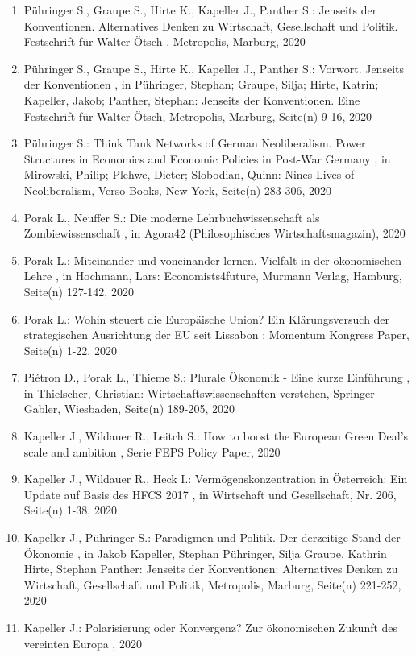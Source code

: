 \begin{enumerate}[leftmargin=*, labelsep=0.5cm]
	 \item Pühringer S., Graupe S., Hirte K., Kapeller J., Panther S.:  Jenseits der Konventionen. Alternatives Denken zu Wirtschaft, Gesellschaft und Politik. Festschrift für Walter Ötsch  , Metropolis, Marburg, 2020
	 \item Pühringer S., Graupe S., Hirte K., Kapeller J., Panther S.:  Vorwort. Jenseits der Konventionen  , in Pühringer, Stephan; Graupe, Silja; Hirte, Katrin; Kapeller, Jakob; Panther, Stephan: Jenseits der Konventionen. Eine Festschrift für Walter Ötsch, Metropolis, Marburg, Seite(n) 9-16, 2020
	 \item Pühringer S.:  Think Tank Networks of German Neoliberalism. Power Structures in Economics and Economic Policies in Post-War Germany  , in Mirowski, Philip; Plehwe, Dieter; Slobodian, Quinn: Nines Lives of Neoliberalism, Verso Books, New York, Seite(n) 283-306, 2020
	 \item Porak L., Neuffer S.:  Die moderne Lehrbuchwissenschaft als Zombiewissenschaft  , in Agora42 (Philosophisches Wirtschaftsmagazin), 2020
	 \item Porak L.:  Miteinander und voneinander lernen. Vielfalt in der ökonomischen Lehre  , in Hochmann, Lars: Economists4future, Murmann Verlag, Hamburg, Seite(n) 127-142, 2020
	 \item Porak L.:  Wohin steuert die Europäische Union? Ein Klärungsversuch der strategischen Ausrichtung der EU seit Lissabon  : Momentum Kongress Paper, Seite(n) 1-22, 2020
	 \item Piétron D., Porak L., Thieme S.:  Plurale Ökonomik - Eine kurze Einführung  , in Thielscher, Christian: Wirtschaftswissenschaften verstehen, Springer Gabler, Wiesbaden, Seite(n) 189-205, 2020
	 \item Kapeller J., Wildauer R., Leitch S.:  How to boost the European Green Deal’s scale and ambition  , Serie FEPS Policy Paper, 2020
	 \item Kapeller J., Wildauer R., Heck I.:  Vermögenskonzentration in Österreich: Ein Update auf Basis des HFCS 2017  , in Wirtschaft und Gesellschaft, Nr. 206, Seite(n) 1-38, 2020
	 \item Kapeller J., Pühringer S.:  Paradigmen und Politik. Der derzeitige Stand der Ökonomie  , in Jakob Kapeller, Stephan Pühringer, Silja Graupe, Kathrin Hirte, Stephan Panther: Jenseits der Konventionen: Alternatives Denken zu Wirtschaft, Gesellschaft und Politik, Metropolis, Marburg, Seite(n) 221-252, 2020
	 \item Kapeller J.:  Polarisierung oder Konvergenz? Zur ökonomischen Zukunft des vereinten Europa  , 2020

\end{enumerate}
